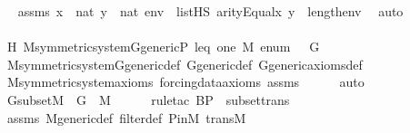 \begin{isabellebody}
\ \isamarkupfalse%
\ assms{}{\isacharcolon}{\kern0pt}\ {\isachardoublequoteopen}x\ {\isasymin}\ nat{\isachardoublequoteclose}\ {\isachardoublequoteopen}y\ {\isasymin}\ nat{\isachardoublequoteclose}\ {\isachardoublequoteopen}env\ {\isasymin}\ list{\isacharparenleft}{\kern0pt}HS{\isacharparenright}{\kern0pt}{\isachardoublequoteclose}\ {\isachardoublequoteopen}arity{\isacharparenleft}{\kern0pt}Equal{\isacharparenleft}{\kern0pt}x{\isacharcomma}{\kern0pt}\ y{\isacharparenright}{\kern0pt}{\isacharparenright}{\kern0pt}\ {\isasymle}\ length{\isacharparenleft}{\kern0pt}env{\isacharparenright}{\kern0pt}{\isachardoublequoteclose}\ \isamarkupfalse%
\ auto\isanewline
\ \ \ \ \ \ \ \ \ \ \ \ \ \ \ \ \ \ \ \ \ \ \ \ \ \ \ \ \ \ \ \ \ \ \ \ \ \ \ \ \ \ \ \ \ \isanewline
\ \ \isamarkupfalse%
\ H{\isacharcolon}{\kern0pt}\ {\isachardoublequoteopen}M{\isacharunderscore}{\kern0pt}symmetric{\isacharunderscore}{\kern0pt}system{\isacharunderscore}{\kern0pt}G{\isacharunderscore}{\kern0pt}generic{\isacharparenleft}{\kern0pt}P{\isacharcomma}{\kern0pt}\ leq{\isacharcomma}{\kern0pt}\ one{\isacharcomma}{\kern0pt}\ M{\isacharcomma}{\kern0pt}\ enum{\isacharcomma}{\kern0pt}\ {\isasymG}{\isacharcomma}{\kern0pt}\ {\isasymF}{\isacharcomma}{\kern0pt}\ G{\isacharparenright}{\kern0pt}{\isachardoublequoteclose}\isanewline
\ \ \ \ \isamarkupfalse%
\ M{\isacharunderscore}{\kern0pt}symmetric{\isacharunderscore}{\kern0pt}system{\isacharunderscore}{\kern0pt}G{\isacharunderscore}{\kern0pt}generic{\isacharunderscore}{\kern0pt}def\ G{\isacharunderscore}{\kern0pt}generic{\isacharunderscore}{\kern0pt}def\ G{\isacharunderscore}{\kern0pt}generic{\isacharunderscore}{\kern0pt}axioms{\isacharunderscore}{\kern0pt}def\isanewline
\ \ \ \ \isamarkupfalse%
\ M{\isacharunderscore}{\kern0pt}symmetric{\isacharunderscore}{\kern0pt}system{\isacharunderscore}{\kern0pt}axioms\ forcing{\isacharunderscore}{\kern0pt}data{\isacharunderscore}{\kern0pt}axioms\ assms\isanewline
\ \ \ \ \isamarkupfalse%
\ auto\isanewline
\isanewline
\ \ \isamarkupfalse%
\ GsubsetM\ {\isacharcolon}{\kern0pt}\ {\isachardoublequoteopen}G\ {\isasymsubseteq}\ M{\isachardoublequoteclose}\ \isanewline
\ \ \ \ \isamarkupfalse%
{\isacharparenleft}{\kern0pt}rule{\isacharunderscore}{\kern0pt}tac\ B{\isacharequal}{\kern0pt}P\ \ subset{\isacharunderscore}{\kern0pt}trans{\isacharparenright}{\kern0pt}\isanewline
\ \ \ \ \isamarkupfalse%
\ assms\ M{\isacharunderscore}{\kern0pt}generic{\isacharunderscore}{\kern0pt}def\ filter{\isacharunderscore}{\kern0pt}def\ P{\isacharunderscore}{\kern0pt}in{\isacharunderscore}{\kern0pt}M\ transM\ \isanewline

\end{isabellebody}

